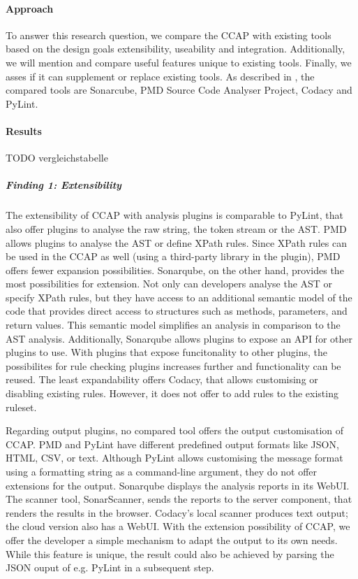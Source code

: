 \paragraph{Approach}
To answer this research question, we compare the CCAP with existing tools based on the design goals extensibility, useability and integration. Additionally, we will mention and compare useful features unique to existing tools. Finally, we asses if it can supplement or replace existing tools. As described in , the compared tools are Sonarcube, PMD Source Code Analyser Project, Codacy and PyLint.

\paragraph{Results}
TODO vergleichstabelle

\subparagraph{Finding 1: Extensibility}
The extensibility of CCAP with analysis plugins is comparable to PyLint, that also offer plugins to analyse the raw string, the token stream or the AST. PMD allows plugins to analyse the AST or define XPath rules. Since XPath rules can be used in the CCAP as well (using a third-party library in the plugin), PMD offers fewer expansion possibilities. Sonarqube, on the other hand, provides the most possibilities for extension. Not only can developers analyse the AST or specify XPath rules, but they have access to an additional semantic model of the code that provides direct access to structures such as methods, parameters, and return values. This semantic model simplifies an analysis in comparison to the AST analysis.
Additionally, Sonarqube allows plugins to expose an API for other plugins to use. With plugins that expose funcitonality to other plugins, the possibilites for rule checking plugins increases further and functionality can be reused. The least expandability offers Codacy, that allows customising or disabling existing rules. However, it does not offer to add rules to the existing ruleset.

Regarding output plugins, no compared tool offers the output customisation of CCAP. PMD and PyLint have different predefined output formats like JSON, HTML, CSV, or text. Although PyLint allows customising the message format using a formatting string as a command-line argument, they do not offer extensions for the output. Sonarqube displays the analysis reports in its WebUI. The scanner tool, SonarScanner, sends the reports to the server component, that renders the results in the browser. Codacy's local scanner produces text output; the cloud version also has a WebUI. 
With the extension possibility of CCAP, we offer the developer a simple mechanism to adapt the output to its own needs. While this feature is unique, the result could also be achieved by parsing the JSON ouput of e.g. PyLint in a subsequent step.

